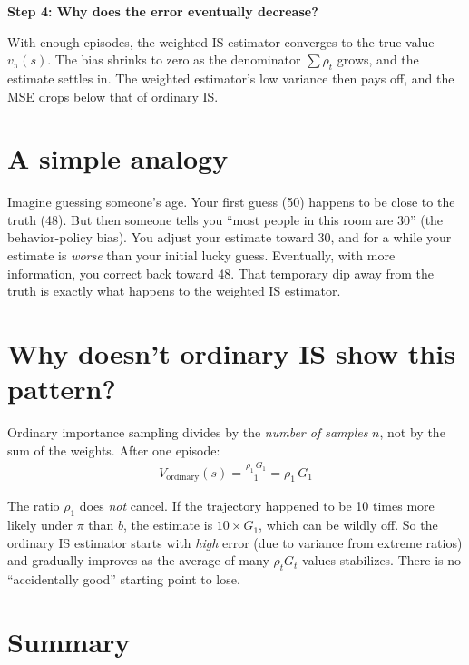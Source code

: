 \documentclass[11pt]{article}
\begin{document}
\textbf{Step 4: Why does the error eventually decrease?}

With enough episodes, the weighted IS estimator converges to the true value $v_\pi(s)$. The bias shrinks to zero as the denominator $\sum \rho_t$ grows, and the estimate settles in. The weighted estimator's low variance then pays off, and the MSE drops below that of ordinary IS.

\section*{A simple analogy}

Imagine guessing someone's age. Your first guess (50) happens to be close to the truth (48). But then someone tells you ``most people in this room are 30'' (the behavior-policy bias). You adjust your estimate toward 30, and for a while your estimate is \textit{worse} than your initial lucky guess. Eventually, with more information, you correct back toward 48. That temporary dip away from the truth is exactly what happens to the weighted IS estimator.

\section*{Why doesn't ordinary IS show this pattern?}

Ordinary importance sampling divides by the \textit{number of samples} $n$, not by the sum of the weights. After one episode:
\begin{align}
    V_{\text{ordinary}}(s) = \frac{\rho_1 \, G_1}{1} = \rho_1 \, G_1
\end{align}

The ratio $\rho_1$ does \textit{not} cancel. If the trajectory happened to be 10 times more likely under $\pi$ than $b$, the estimate is $10 \times G_1$, which can be wildly off. So the ordinary IS estimator starts with \textit{high} error (due to variance from extreme ratios) and gradually improves as the average of many $\rho_t G_t$ values stabilizes. There is no ``accidentally good'' starting point to lose.

\section*{Summary}
\end{document}
